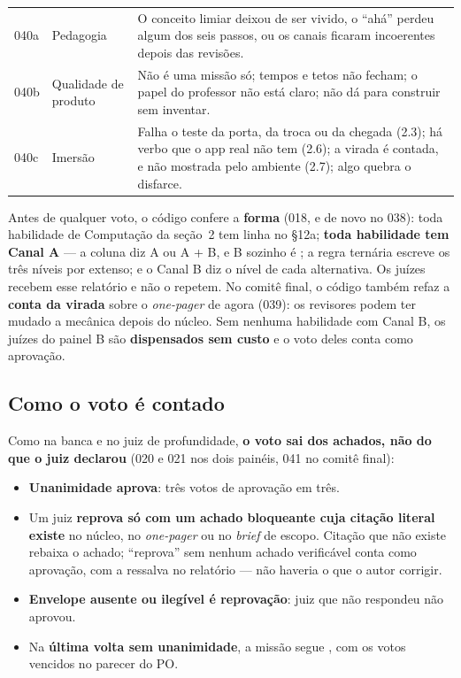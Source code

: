 \documentclass[11pt,a4paper]{article}
\newcommand{\cod}[1]{{\ttfamily\small #1}}
\newcommand{\bolinha}[1]{\tikz[baseline=-0.5ex]{\fill[#1] (0,0) circle (0.33em);}}
\newcommand{\statusAmbar}{\bolinha{sinalAmbar}}
\newcommand{\statusVermelho}{\bolinha{sinalVermelho}}
\begin{document}
\begin{center}
\begin{longtable}{>{\raggedright\arraybackslash}p{1.25cm}>{\raggedright\arraybackslash}p{2.6cm}p{10.75cm}}
\footnotesize 040a & \footnotesize Pedagogia & \footnotesize O conceito limiar deixou de ser vivido, o ``ahá'' perdeu algum dos seis passos, ou os canais ficaram incoerentes depois das revisões. \\
\footnotesize 040b & \footnotesize Qualidade de produto & \footnotesize Não é uma missão só; tempos e tetos não fecham; o papel do professor não está claro; não dá para construir sem inventar. \\
\footnotesize 040c & \footnotesize Imersão & \footnotesize Falha o teste da porta, da troca ou da chegada (2.3); há verbo que o app real não tem (2.6); a virada é contada, e não mostrada pelo ambiente (2.7); algo quebra o disfarce. \\
\bottomrule
\end{longtable}
\end{center}

Antes de qualquer voto, o código confere a \textbf{forma} (018, e de novo no 038): toda habilidade de Computação da seção~2 tem linha no \S12a; \textbf{toda habilidade tem Canal A} --- a coluna diz \cod{A} ou \cod{A + B}, e \cod{B} sozinho é \statusVermelho; a regra ternária escreve os três níveis por extenso; e o Canal B diz o nível de cada alternativa. Os juízes recebem esse relatório e não o repetem. No comitê final, o código também refaz a \textbf{conta da virada} sobre o \emph{one-pager} de agora (039): os revisores podem ter mudado a mecânica depois do núcleo. Sem nenhuma habilidade com Canal B, os juízes do painel B são \textbf{dispensados sem custo} e o voto deles conta como aprovação.

\subsection{Como o voto é contado}

Como na banca e no juiz de profundidade, \textbf{o voto sai dos achados, não do que o juiz declarou} (020 e 021 nos dois painéis, 041 no comitê final):

\begin{itemize}
  \item \textbf{Unanimidade aprova}: três votos de aprovação em três.
  \item Um juiz \textbf{reprova só com um achado bloqueante cuja citação literal existe} no núcleo, no \emph{one-pager} ou no \emph{brief} de escopo. Citação que não existe rebaixa o achado; ``reprova'' sem nenhum achado verificável conta como aprovação, com a ressalva no relatório --- não haveria o que o autor corrigir.
  \item \textbf{Envelope ausente ou ilegível é reprovação}: juiz que não respondeu não aprovou.
  \item Na \textbf{última volta sem unanimidade}, a missão segue \statusAmbar, com os votos vencidos no parecer do PO.
\end{itemize}
\end{document}
